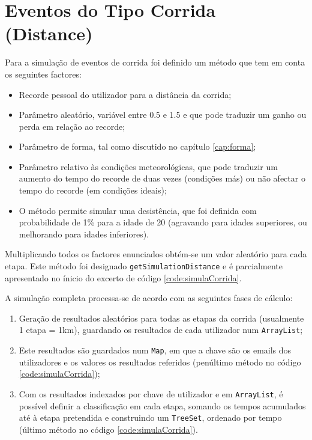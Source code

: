 \documentclass[a4paper,10pt]{report}
\begin{document}
\section{Eventos do Tipo Corrida (Distance)}
\label{sec:simulaCorrida}
Para a simulação de eventos de corrida foi definido um método que tem em conta os seguintes factores:
\begin{itemize}
 \item Recorde pessoal do utilizador para a distância da corrida;
 \item Parâmetro aleatório, variável entre 0.5 e 1.5 e que pode traduzir um ganho ou perda em relação ao recorde;
 \item Parâmetro de forma, tal como discutido no capítulo \ref{cap:forma};
 \item Parâmetro relativo às condições meteorológicas, que pode traduzir um aumento do tempo do recorde de duas vezes (condições más)
	  ou não afectar o tempo do recorde (em condições ideais);
 \item O método permite simular uma desistência, que foi definida com probabilidade de 1\% para a idade de 20 (agravando para idades superiores, 
	  ou melhorando para idades inferiores).
\end{itemize}
Multiplicando todos os factores enunciados obtém-se um valor aleatório para cada etapa.
Este método foi designado \verb!getSimulationDistance! e é parcialmente apresentado no ínicio do excerto de código \ref{code:simulaCorrida}.

A simulação completa processa-se de acordo com as seguintes fases de cálculo:
\begin{enumerate}
 \item Geração de resultados aleatórios para todas as etapas da corrida (usualmente 1 etapa = 1km), 
	  guardando os resultados de cada utilizador num \verb!ArrayList!;
 \item Este resultados são guardados num \verb!Map!, em que a chave são os emails dos utilizadores e os valores os resultados referidos 
	  (penúltimo método no código \ref{code:simulaCorrida});
 \item Com os resultados indexados por chave de utilizador e em \verb!ArrayList!, é possível definir a classificação em cada etapa,
	  somando os tempos acumulados até à etapa pretendida e construindo um \verb!TreeSet!, ordenado por tempo
	  (último método no código \ref{code:simulaCorrida}).
\end{enumerate}
\end{document}
